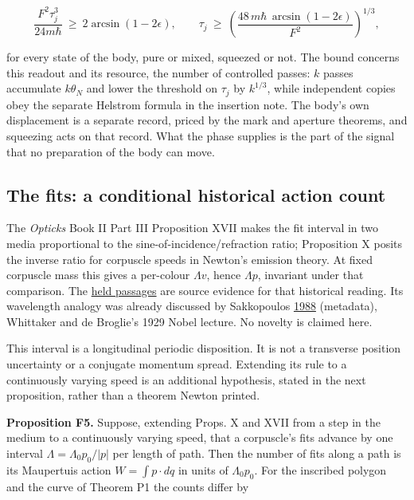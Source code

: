 \documentclass[11pt,a4paper]{article}
\begin{document}
\[\frac{F^2\tau_j^3}{24m\hbar}\ \ge\ 2\arcsin(1-2\epsilon),\qquad
\tau_j\ \ge\ \left(\frac{48\,m\hbar\,\arcsin(1-2\epsilon)}{F^2}\right)^{1/3},\]

for every state of the body, pure or mixed, squeezed or not. The bound
concerns this readout and its resource, the number of controlled passes:
\(k\) passes accumulate \(k\theta_N\) and lower the threshold on
\(\tau_j\) by \(k^{1/3}\), while independent copies obey the separate
Helstrom formula in the insertion note. The body's own displacement is a
separate record, priced by the mark and aperture theorems, and squeezing
acts on that record. What the phase supplies is the part of the signal
that no preparation of the body can move.

\hypertarget{the-fits-a-conditional-historical-action-count}{%
\subsection{The fits: a conditional historical action
count}\label{the-fits-a-conditional-historical-action-count}}

The \emph{Opticks} Book II Part III Proposition XVII makes the fit
interval in two media proportional to the sine-of-incidence/refraction
ratio; Proposition X posits the inverse ratio for corpuscle speeds in
Newton's emission theory. At fixed corpuscle mass this gives a
per-colour \(\Lambda v\), hence \(\Lambda p\), invariant under that
comparison. The
\href{../docs/classics/Newton_Opticks_1730_fits_and_queries.md}{held
passages} are source evidence for that historical reading. Its
wavelength analogy was already discussed by Sakkopoulos
\href{https://doi.org/10.1088/0143-0807/9/2/007}{1988} (metadata),
Whittaker and de Broglie's 1929 Nobel lecture. No novelty is claimed
here.

This interval is a longitudinal periodic disposition. It is not a
transverse position uncertainty or a conjugate momentum spread.
Extending its rule to a continuously varying speed is an additional
hypothesis, stated in the next proposition, rather than a theorem Newton
printed.

\textbf{Proposition F5.} Suppose, extending Props. X and XVII from a
step in the medium to a continuously varying speed, that a corpuscle's
fits advance by one interval \(\Lambda=\Lambda_0p_0/|p|\) per length of
path. Then the number of fits along a path is its Maupertuis action
\(W=\int p\cdot dq\) in units of \(\Lambda_0p_0\). For the inscribed
polygon and the curve of Theorem P1 the counts differ by
\end{document}
